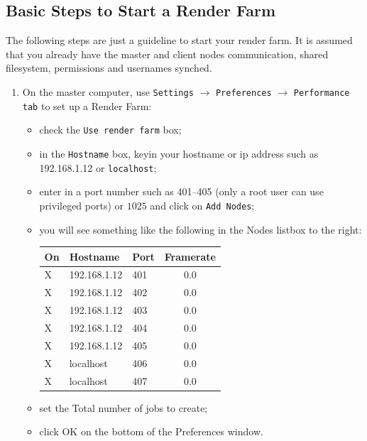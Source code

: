 \subsection{Basic Steps to Start a Render Farm}%
\label{sub:basic_steps_start_render_farm}

The following steps are just a guideline to start your render farm.  It is assumed that you already have the master and client nodes communication, shared filesystem, permissions and usernames synched.

\begin{enumerate}
    \item On the master computer, use \texttt{Settings} $\rightarrow$ \texttt{Preferences} $\rightarrow$ \texttt{Performance} \texttt{tab} to set up a Render Farm:
    \begin{itemize}
        \item check the \texttt{Use render farm} box;
        \item in the \texttt{Hostname} box, keyin your hostname or ip address such as 192.168.1.12 or \texttt{localhost};
        \item enter in a port number such as 401--405 (only a root user can use privileged ports) or $1025$  and click on \texttt{Add Nodes};
        \item you will see something like the following in the Nodes listbox to the right:\newline
            \begin{tabular}{lllc}
                On & Hostname     & Port & Framerate \\\midrule
                X  & 192.168.1.12 & 401  & 0.0       \\
                X  & 192.168.1.12 & 402  & 0.0       \\
                X  & 192.168.1.12 & 403  & 0.0       \\
                X  & 192.168.1.12 & 404  & 0.0       \\
                X  & 192.168.1.12 & 405  & 0.0       \\
                X  & localhost    & 406  & 0.0       \\
                X  & localhost    & 407  & 0.0       \\
            \end{tabular}
        \item set the Total number of jobs to create;
        \item click OK on the bottom of the Preferences window.
    \end{itemize}

\end{enumerate}
